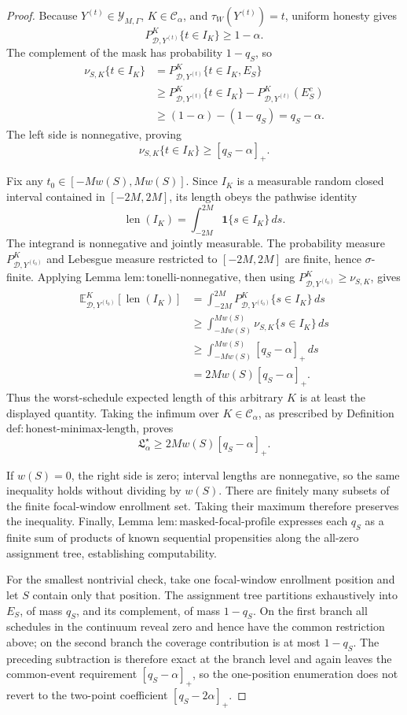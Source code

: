 \documentclass{article}
\begin{document}
\begin{proof}
Because \(Y^{(t)}\in\mathcal Y_{M,\Gamma}\), \(K\in\mathcal C_\alpha\), and \(\tau_W(Y^{(t)})=t\), uniform honesty gives
\[
 P^K_{\mathcal D,Y^{(t)}}\{t\in I_K\}\ge1-\alpha.
\]
The complement of the mask has probability \(1-q_S\), so
\begin{align*}
 \nu_{S,K}\{t\in I_K\}
 &=P^K_{\mathcal D,Y^{(t)}}\{t\in I_K,E_S\}\\
 &\ge P^K_{\mathcal D,Y^{(t)}}\{t\in I_K\}
       -P^K_{\mathcal D,Y^{(t)}}(E_S^c)\\
 &\ge (1-\alpha)-(1-q_S)
 =q_S-\alpha.
\end{align*}
The left side is nonnegative, proving
\[
 \nu_{S,K}\{t\in I_K\}\ge[q_S-\alpha]_+.
\]

Fix any \(t_0\in[-Mw(S),Mw(S)]\).  Since \(I_K\) is a measurable random closed interval contained in \([-2M,2M]\), its length obeys the pathwise identity
\[
 \operatorname{len}(I_K)
 =\int_{-2M}^{2M}\mathbf 1\{s\in I_K\}\,ds.
\]
The integrand is nonnegative and jointly measurable.  The probability measure \(P^K_{\mathcal D,Y^{(t_0)}}\) and Lebesgue measure restricted to \([-2M,2M]\) are finite, hence \(\sigma\)-finite.  Applying Lemma \(\mathrm{lem:tonelli\text{-}nonnegative}\), then using \(P^K_{\mathcal D,Y^{(t_0)}}\ge\nu_{S,K}\), gives
\begin{align*}
 \mathbb E^K_{\mathcal D,Y^{(t_0)}}[\operatorname{len}(I_K)]
 &=\int_{-2M}^{2M}
 P^K_{\mathcal D,Y^{(t_0)}}\{s\in I_K\}\,ds\\
 &\ge\int_{-Mw(S)}^{Mw(S)}\nu_{S,K}\{s\in I_K\}\,ds\\
 &\ge\int_{-Mw(S)}^{Mw(S)}[q_S-\alpha]_+\,ds\\
 &=2Mw(S)[q_S-\alpha]_+.
\end{align*}
Thus the worst-schedule expected length of this arbitrary \(K\) is at least the displayed quantity.  Taking the infimum over \(K\in\mathcal C_\alpha\), as prescribed by Definition \(\mathrm{def:honest\text{-}minimax\text{-}length}\), proves
\[
 \mathfrak L_\alpha^\star\ge2Mw(S)[q_S-\alpha]_+.
\]

If \(w(S)=0\), the right side is zero; interval lengths are nonnegative, so the same inequality holds without dividing by \(w(S)\).  There are finitely many subsets of the finite focal-window enrollment set.  Taking their maximum therefore preserves the inequality.  Finally, Lemma \(\mathrm{lem:masked\text{-}focal\text{-}profile}\) expresses each \(q_S\) as a finite sum of products of known sequential propensities along the all-zero assignment tree, establishing computability.

For the smallest nontrivial check, take one focal-window enrollment position and let \(S\) contain only that position.  The assignment tree partitions exhaustively into \(E_S\), of mass \(q_S\), and its complement, of mass \(1-q_S\).  On the first branch all schedules in the continuum reveal zero and hence have the common restriction above; on the second branch the coverage contribution is at most \(1-q_S\).  The preceding subtraction is therefore exact at the branch level and again leaves the common-event requirement \([q_S-\alpha]_+\), so the one-position enumeration does not revert to the two-point coefficient \([q_S-2\alpha]_+\).
\end{proof}
\end{document}
